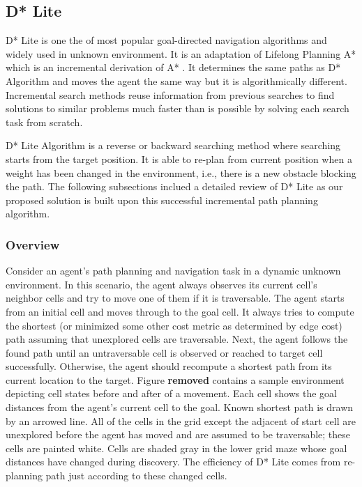 \documentclass[10pt,journal]{IEEEtran}
\begin{document}

\subsection{D* Lite}

D* Lite \cite{Koenig:2002} is one the of most popular goal-directed navigation algorithms and widely used in unknown environment. It is an adaptation of Lifelong Planning A* \cite{LPAStarKoenig:2004} which is an incremental derivation of A* \cite{AStarHart:1968}. It determines the same paths as D* Algorithm \cite{DStar:1994} and moves the agent the same way but it is algorithmically different. Incremental search methods reuse information from previous searches to find solutions to similar problems much faster than is possible by solving each search task from scratch.

D* Lite Algorithm is a reverse or backward searching method where searching starts from the target position. It is able to re-plan from current position when a weight has been changed in the environment, i.e., there is a new obstacle blocking the path. The following subsections inclued a detailed review of D* Lite  as our proposed solution is built upon this successful incremental path planning algorithm.

\subsubsection{Overview}

Consider an agent's path planning and navigation task in a dynamic unknown environment. In this scenario, the agent always observes its current cell's neighbor cells and try to move one of them if it is traversable. The agent starts from an initial cell and moves through to the goal cell. It always tries to compute the shortest (or minimized some other cost metric as determined by edge cost) path assuming that unexplored cells are traversable. Next, the agent follows the found path until an untraversable cell is observed or reached to target cell successfully. Otherwise, the agent should recompute a shortest path from its current location to the target. Figure \textbf{removed} contains a sample environment depicting cell states before and after of a movement. Each cell shows the goal distances from the agent's current cell to the goal. Known shortest path is drawn by an arrowed line. All of the cells in the grid except the adjacent of start cell are unexplored before the agent has moved and are assumed to be traversable; these cells are painted white. Cells are shaded gray in the lower grid maze whose goal distances have changed during discovery. The efficiency of D* Lite comes from re-planning path just according to these changed cells.
\end{document}
